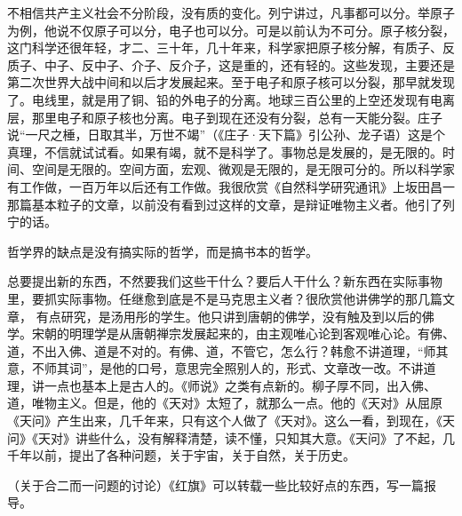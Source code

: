 不相信共产主义社会不分阶段，没有质的变化。列宁讲过，凡事都可以分。举原子为例，他说不仅原子可以分，电子也可以分。可是以前认为不可分。原子核分裂，这门科学还很年轻，才二、三十年，几十年来，科学家把原子核分解，有质子、反质子、中子、反中子、介子、反介子，这是重的，还有轻的。这些发现，主要还是第二次世界大战中间和以后才发展起来。至于电子和原子核可以分裂，那早就发现了。电线里，就是用了铜、铅的外电子的分离。地球三百公里的上空还发现有电离层，那里电子和原子核也分离。电子到现在还没有分裂，总有一天能分裂。庄子说“一尺之棰，日取其半，万世不竭”（《庄子·天下篇》引公孙、龙子语）这是个真理，不信就试试看。如果有竭，就不是科学了。事物总是发展的，是无限的。时间、空间是无限的。空间方面，宏观、微观是无限的，是无限可分的。所以科学家有工作做，一百万年以后还有工作做。我很欣赏《自然科学研究通讯》上坂田昌一那篇基本粒子的文章，以前没有看到过这样的文章，是辩证唯物主义者。他引了列宁的话。

哲学界的缺点是没有搞实际的哲学，而是搞书本的哲学。

总要提出新的东西，不然要我们这些干什么？要后人干什么？新东西在实际事物里，要抓实际事物。任继愈到底是不是马克思主义者？很欣赏他讲佛学的那几篇文章， 有点研究，是汤用彤的学生。他只讲到唐朝的佛学，没有触及到以后的佛学。宋朝的明理学是从唐朝禅宗发展起来的，由主观唯心论到客观唯心论。有佛、道，不出入佛、道是不对的。有佛、道，不管它，怎么行？韩愈不讲道理，“师其意，不师其词”，是他的口号，意思完全照别人的，形式、文章改一改。不讲道理，讲一点也基本上是古人的。《师说》之类有点新的。柳子厚不同，出入佛、道，唯物主义。但是，他的《天对》太短了，就那么一点。他的《天对》从屈原《天问》产生出来，几千年来，只有这个人做了《天对》。这么一看，到现在，《天问》《天对》讲些什么，没有解释清楚，读不懂，只知其大意。《天问》了不起，几千年以前，提出了各种问题，关于宇宙，关于自然，关于历史。

（关于合二而一问题的讨论）《红旗》可以转载一些比较好点的东西，写一篇报导。

